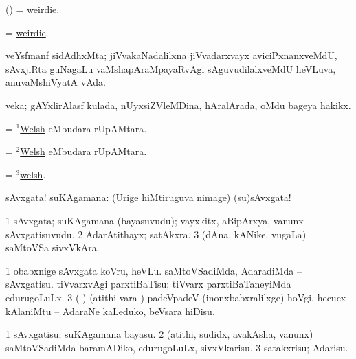 \bentry
{} 
\gl{\nA}
\bmng
(\AmA) = \hyperlink{weirdie}{weirdie}. 
\emng
\eentry

\bentry
{} 
\gl{\nA}
\expl{}
\bmng
= \hyperlink{weirdie}{weirdie}. 
\emng
\eentry

\bentry
{} 
\gl{\nA}
\expl{}
\bmng
veYsfmanf sidAdhxMta; jiVvakaNadalilxna jiVvadarxvayx aviciPxnanxveMdU, sAvxjiRta guNagaLu vaMshapAraMpayaRvAgi sAguvudilalxveMdU heVLuva, anuvaMshiVyatA vAda. 
\emng
\eentry

\bentry
{} 
\gl{\nA}
\expl{}
\bmng
veka; gAYxlirAlasf kulada, nUyxsiZVleMDina, hAralArada, oMdu bageya hakikx. 
\emng
\eentry

\bentry
{} 
\gl{\gu}
\expl{}
\bmng
= \hyperlink{Welsh(1)}{$^1$Welsh} eMbudara rUpAMtara. 
\emng
\eentry

\bentry
{} 
\gl{\nA}
\expl{}
\bmng
= \hyperlink{Welsh(2)}{$^2$Welsh} eMbudara rUpAMtara. 
\emng
\eentry

\bentry
{} 
\gl{\akirx}
\expl{}
\bmng
= \hyperlink{welsh(3)}{$^3$welsh}. 
\emng
\eentry

\bentry
{} 
\gl{\BAavayx}
\expl{}
\bmng
sAvxgata! suKAgamana:  (Urige hiMtiruguva nimage) (su)sAvxgata! 
\emng
\eentry

\bentry
{} 
\gl{\nA}
\expl{}
\bmng
\bnum
\num{1} sAvxgata; suKAgamana (bayasuvudu); vayxkitx, aBipArxya, \mo vanunx sAvxgatisuvudu. 
\num{2} AdarAtithayx; satAkxra. 
\num{3} (dAna, kANike, \mo vugaLa) saMtoVSa sivxVkAra. 
\enum
\emng

\noindent 
\gl{\pagu}
\expl{}
\bmng
\bnum
\num{1}  obabxnige sAvxgata koVru, heVLu. 
  
\banum
{} saMtoVSadiMda, AdaradiMda -- sAvxgatisu. 
 tiVvarxvAgi parxtiBaTisu; tiVvarx parxtiBaTaneyiMda edurugoLuLx. 
\eanum
\numie
\num{3}  (   )  (atithi \mo vara \vi) padeVpadeV (inonxbabxralilxge) hoVgi, hecucx kAlaniMtu -- AdaraNe kaLeduko, beVsara hiDisu. 
\enum
\emng
\eentry

\bentry
{} 
\gl{\sakirx}
\expl{}
\bmng
\bnum
\num{1} sAvxgatisu; suKAgamana bayasu. 
\num{2} (atithi, sudidx, avakAsha, \mo vanunx) saMtoVSadiMda baramADiko, edurugoLuLx, sivxVkarisu. 
\num{3} satakxrisu; Adarisu. 
\enum
\emng
\eentry

